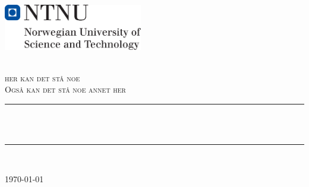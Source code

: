 \begin{titlepage}
\includegraphics[height=2cm]{fig/hovedlogo_eng.png}\\[1cm]
\begin{center}

 
~\\[1.5cm]

\textsc{\Large her kan det stå noe \\ Også kan det stå noe annet her}\\[0.6cm]

\hrule ~\\[0.4cm]
{\huge \bfseries \mytitle}\\[0.4cm]		%
\hrule ~\\[1.5cm]

\begin{minipage}{0.6\textwidth}
    \centering
	\large
		\emph{\myauthor}
\end{minipage}

\vfill

{\large \today}

\end{center}
\end{titlepage}

\cleardoublepage